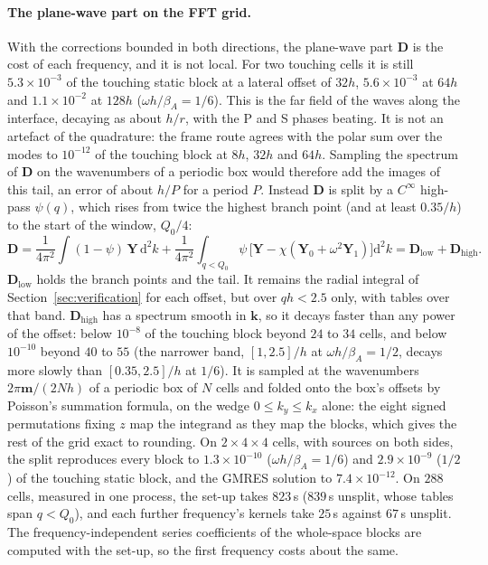\documentclass[11pt,a4paper]{article}
\newcommand{\bk}{\mathbf{k}}
\newcommand{\dd}{\mathrm{d}}
\begin{document}
\paragraph{The plane-wave part on the FFT grid.} With the corrections bounded in both directions, the plane-wave
part $\mathbf D$ is the cost of each frequency, and it is not local. For two touching cells it is still
$5.3\times10^{-3}$ of the touching static block at a lateral offset of $32h$, $5.6\times10^{-3}$ at $64h$ and
$1.1\times10^{-2}$ at $128h$ ($\omega h/\beta_A=1/6$). This is the far field of the waves along the interface,
decaying as about $h/r$, with the P and S phases beating. It is not an artefact of the quadrature: the frame route
agrees with the polar sum over the modes to $10^{-12}$ of the touching block at $8h$, $32h$ and $64h$. Sampling
the spectrum of $\mathbf D$ on the wavenumbers of a periodic box would therefore add the images of this tail, an
error of about $h/P$ for a period $P$. Instead $\mathbf D$ is split by a $C^\infty$ high-pass $\psi(q)$, which
rises from twice the highest branch point (and at least $0.35/h$) to the start of the window, $Q_0/4$:
\begin{equation}\label{eq:dsplit}
  \mathbf D=\frac{1}{4\pi^2}\int(1-\psi)\,\mathbf Y\,\dd^2k
  +\frac{1}{4\pi^2}\int_{q<Q_0}\psi\,\bigl[\mathbf Y-\chi(\mathbf Y_0+\omega^2\mathbf Y_1)\bigr]\dd^2k
  =\mathbf D_{\mathrm{low}}+\mathbf D_{\mathrm{high}}.
\end{equation}
$\mathbf D_{\mathrm{low}}$ holds the branch points and the tail. It remains the radial integral of
Section~\ref{sec:verification} for each offset, but over $qh<2.5$ only, with tables over that band.
$\mathbf D_{\mathrm{high}}$ has a spectrum smooth in $\bk$, so it decays faster than any power of the offset:
below $10^{-8}$ of the touching block beyond $24$ to $34$ cells, and below $10^{-10}$ beyond $40$ to $55$ (the
narrower band, $[1,2.5]/h$ at $\omega h/\beta_A=1/2$, decays more slowly than $[0.35,2.5]/h$ at $1/6$). It is
sampled at the wavenumbers $2\pi\mathbf m/(2Nh)$ of a periodic box of $N$ cells and folded onto the box's offsets by
Poisson's summation formula, on the wedge $0\le k_y\le k_x$ alone: the eight signed permutations fixing $z$ map
the integrand as they map the blocks, which gives the rest of the grid exact to rounding. On $2\times4\times4$
cells, with sources on both sides, the split reproduces every block to $1.3\times10^{-10}$
($\omega h/\beta_A=1/6$) and $2.9\times10^{-9}$ ($1/2$) of the touching static block, and the GMRES solution to
$7.4\times10^{-12}$. On $288$ cells, measured in one process, the set-up takes $823$\,s ($839$\,s unsplit, whose
tables span $q<Q_0$), and each further frequency's kernels take $25$\,s against $67$\,s unsplit. The
frequency-independent series coefficients of the whole-space blocks are computed with the set-up, so the first
frequency costs about the same.
\end{document}
